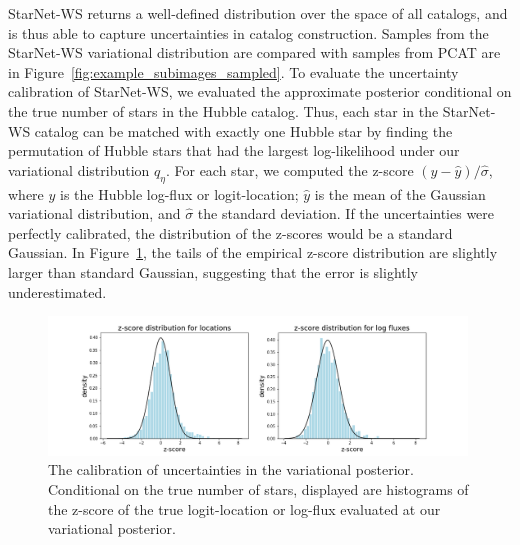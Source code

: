 StarNet-WS returns a well-defined distribution over the space of all catalogs, 
and is thus able to capture uncertainties in catalog construction. 
Samples from the StarNet-WS variational distribution are compared with samples from PCAT are in Figure~\ref{fig:example_subimages_sampled}. 
To evaluate the uncertainty calibration of StarNet-WS, we evaluated the approximate posterior 
conditional on the true number of stars in the Hubble catalog. 
Thus, each star in the StarNet-WS catalog can be matched with exactly one Hubble star by finding the permutation of Hubble stars that had the largest log-likelihood under our variational distribution $q_\eta$. 
For each star, we computed the z-score $(y - \hat y) / \hat \sigma$, where $y$ is the Hubble log-flux or 
logit-location; $\hat y$ is the mean of the Gaussian variational distribution, and $\hat\sigma$ the standard deviation.
If the uncertainties were perfectly calibrated, the distribution of the z-scores would be a standard Gaussian. 
In Figure~\ref{fig:z-score_calibration}, the tails of the empirical z-score distribution are slightly larger than standard Gaussian, suggesting that the error is slightly underestimated. 

\begin{figure}[ht]
    \centering
    \includegraphics[width=0.99\textwidth]{figures/z-score_calibration.png}
    \caption{The calibration of uncertainties in the variational posterior. 
    Conditional on the true number of stars, displayed are histograms of the z-score of the true logit-location or log-flux evaluated at our variational posterior. 
}
    \label{fig:z-score_calibration}
\end{figure}


